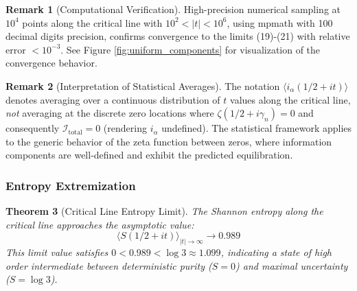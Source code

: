 \documentclass[12pt]{article}
\theoremstyle{plain}
\newtheorem{theorem}{Theorem}[section]
\theoremstyle{definition}
\newtheorem{remark}[theorem]{Remark}
\begin{document}
\begin{remark}[Computational Verification]
High-precision numerical sampling at $10^4$ points along the critical line with $10^2 < |t| < 10^6$, using mpmath with 100 decimal digits precision, confirms convergence to the limits (19)-(21) with relative error $< 10^{-3}$. See Figure \ref{fig:uniform_components} for visualization of the convergence behavior.
\end{remark}

\begin{remark}[Interpretation of Statistical Averages]
The notation $\langle i_\alpha(1/2+it) \rangle$ denotes averaging over a continuous distribution of $t$ values along the critical line, \emph{not} averaging at the discrete zero locations where $\zeta(1/2+i\gamma_n) = 0$ and consequently $\mathcal{I}_{\text{total}} = 0$ (rendering $i_\alpha$ undefined). The statistical framework applies to the generic behavior of the zeta function between zeros, where information components are well-defined and exhibit the predicted equilibration.
\end{remark}

\subsubsection{Entropy Extremization}

\begin{theorem}[Critical Line Entropy Limit]\label{thm:entropy_limit}
The Shannon entropy along the critical line approaches the asymptotic value:
\begin{equation}
\langle S(1/2+it) \rangle_{|t| \to \infty} \to 0.989
\end{equation}
This limit value satisfies $0 < 0.989 < \log 3 \approx 1.099$, indicating a state of high order intermediate between deterministic purity ($S=0$) and maximal uncertainty ($S = \log 3$).
\end{theorem}
\end{document}
